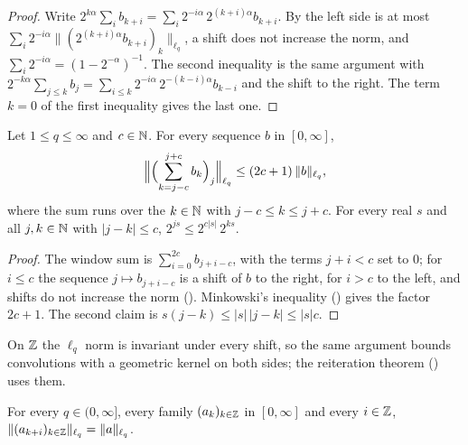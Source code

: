 \begin{proof}
\leanok
Write $2^{k\alpha} \sum_i b_{k+i} = \sum_i 2^{-i\alpha} \, 2^{(k+i)\alpha} b_{k+i}$. By
 the left side is at most
$\sum_i 2^{-i\alpha} \|(2^{(k+i)\alpha} b_{k+i})_k\|_{\ell_q}$, a shift does not increase the
norm, and $\sum_i 2^{-i\alpha} = (1 - 2^{-\alpha})^{-1}$. The second inequality is the same
argument with $2^{-k\alpha} \sum_{j \leq k} b_j = \sum_{i \leq k} 2^{-i\alpha} \,
2^{-(k-i)\alpha} b_{k-i}$ and the shift to the right. The term $k = 0$ of the first inequality
gives the last one.
\end{proof}

\begin{lemma}
\label{lem:window-sums}
\leanok
{}
Let $1 \leq q \leq \infty$ and $c \in \mathbb{N}$. For every sequence $b$ in $[0, \infty]$,
\[
  \Bigl\| \Bigl(\sum_{k = j - c}^{j + c} b_k\Bigr)_j \Bigr\|_{\ell_q}
  \leq (2c + 1) \, \|b\|_{\ell_q} ,
\]
where the sum runs over the $k \in \mathbb{N}$ with $j - c \leq k \leq j + c$. For every real $s$ and
all $j, k \in \mathbb{N}$ with $|j - k| \leq c$, $2^{js} \leq 2^{c|s|} \, 2^{ks}$.
\end{lemma}

\begin{proof}
\leanok
The window sum is $\sum_{i = 0}^{2c} b_{j + i - c}$, with the terms $j + i < c$ set to $0$; for
$i \leq c$ the sequence $j \mapsto b_{j + i - c}$ is a shift of $b$ to the right, for $i > c$ to
the left, and shifts do not increase the norm (). Minkowski's inequality
() gives the factor $2c + 1$. The second claim is
$s(j - k) \leq |s| \, |j - k| \leq |s| c$.
\end{proof}

On $\mathbb{Z}$ the $\ell_q$ norm is invariant under every shift, so the same argument bounds
convolutions with a geometric kernel on both sides; the reiteration theorem
() uses them.

\begin{lemma}
\label{lem:lq-shift-integers}
\leanok
{}
For every $q \in (0, \infty]$, every family $(a_k)_{k \in \mathbb{Z}}$ in $[0, \infty]$ and every
$i \in \mathbb{Z}$, $\|(a_{k+i})_{k \in \mathbb{Z}}\|_{\ell_q} = \|a\|_{\ell_q}$.
\end{lemma}

